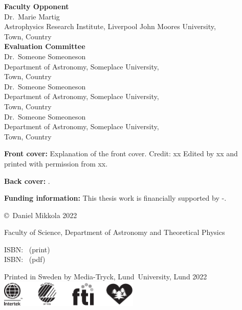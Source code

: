 \documentclass[E5,LUFonts]{lundphdthesis}
\begin{document}
\maketitle


\newpage
\begin{center}
	\textbf{Faculty Opponent} \\
	\vspace{1em}
	Dr.\ Marie Martig\\
	Astrophysics Research Institute, Liverpool John Moores University,\\
	Town, Country\\
	\vspace{1.5em}
	\textbf{Evaluation Committee} \\
	\vspace{1em}
    Dr.\ Someone Someoneson\\
    Department of Astronomy, Someplace University,\\
    Town, Country\\
    \vspace{0.7em}
    Dr.\ Someone Someoneson\\
    Department of Astronomy, Someplace University,\\
    Town, Country\\
	\vspace{0.7em}
    Dr.\ Someone Someoneson\\
    Department of Astronomy, Someplace University,\\
    Town, Country\\
\end{center}
\vfill

{\small\parindent0pt
\textbf{Front cover:} Explanation of the front cover.
Credit: xx Edited by xx and printed with permission from xx.

\textbf{Back cover:} .

\textbf{Funding information:} This thesis work is financially supported by -.

\vspace{1em}
\copyright\, Daniel Mikkola 2022

\vspace{1em}
Faculty of Science, Department of Astronomy and Theoretical Physics

\vspace{1em}
ISBN: ~(print)\\ %
ISBN: ~(pdf) %

\vspace{1em}
Printed in Sweden by Media-Tryck, Lund~University, Lund 2022\\
\includegraphics[width=0.5\textwidth]{logo/miljoeloggor}
}
\end{document}
